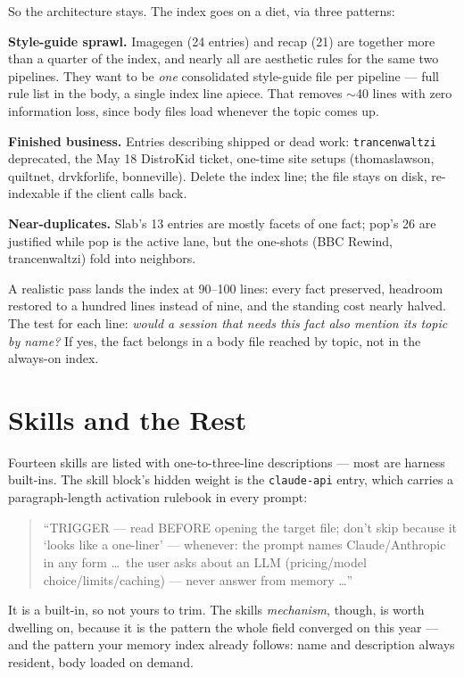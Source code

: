 \documentclass[11pt,letterpaper]{article}
\newenvironment{excerpt}{%
  \par\vspace{0.5em}%
  \begin{quote}\small\color{acdark}%
}{%
  \end{quote}\vspace{0.3em}\par%
}
\begin{document}
So the architecture stays. The index goes on a diet, via three patterns:

\textbf{Style-guide sprawl.} Imagegen (24 entries) and recap (21) are together more than a quarter of the index, and nearly all are aesthetic rules for the same two pipelines. They want to be \textit{one} consolidated style-guide file per pipeline --- full rule list in the body, a single index line apiece. That removes $\sim$40 lines with zero information loss, since body files load whenever the topic comes up.

\textbf{Finished business.} Entries describing shipped or dead work: \texttt{trancenwaltzi} deprecated, the May 18 DistroKid ticket, one-time site setups (thomaslawson, quiltnet, drvkforlife, bonneville). Delete the index line; the file stays on disk, re-indexable if the client calls back.

\textbf{Near-duplicates.} Slab's 13 entries are mostly facets of one fact; pop's 26 are justified while pop is the active lane, but the one-shots (BBC Rewind, trancenwaltzi) fold into neighbors.

A realistic pass lands the index at 90--100 lines: every fact preserved, headroom restored to a hundred lines instead of nine, and the standing cost nearly halved. The test for each line: \textit{would a session that needs this fact also mention its topic by name?} If yes, the fact belongs in a body file reached by topic, not in the always-on index.

\section{Skills and the Rest}

Fourteen skills are listed with one-to-three-line descriptions --- most are harness built-ins. The skill block's hidden weight is the \texttt{claude-api} entry, which carries a paragraph-length activation rulebook in every prompt:

\begin{excerpt}
``TRIGGER --- read BEFORE opening the target file; don't skip because it `looks like a one-liner' --- whenever: the prompt names Claude/Anthropic in any form \ldots\ the user asks about an LLM (pricing/model choice/limits/caching) --- never answer from memory \ldots''
\end{excerpt}

It is a built-in, so not yours to trim. The skills \textit{mechanism}, though, is worth dwelling on, because it is the pattern the whole field converged on this year --- and the pattern your memory index already follows: name and description always resident, body loaded on demand.
\end{document}
